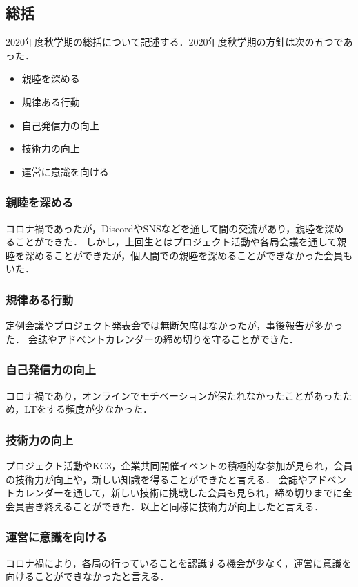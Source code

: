 \subsection*{\firstGrade{}総括}


2020年度秋学期の\firstGrade{}総括について記述する．2020年度秋学期の\firstGrade{}方針は次の五つであった．
\begin{itemize}
	\item 親睦を深める
	\item 規律ある行動
	\item 自己発信力の向上
	\item 技術力の向上
	\item 運営に意識を向ける
\end{itemize}

\subsubsection{親睦を深める}
コロナ禍であったが，DiscordやSNSなどを通して\firstGrade{}間の交流があり，親睦を深めることができた．
しかし，上回生とはプロジェクト活動や各局会議を通して親睦を深めることができたが，個人間での親睦を深めることができなかった会員もいた．

\subsubsection*{規律ある行動}
定例会議やプロジェクト発表会では無断欠席はなかったが，事後報告が多かった．
会誌やアドベントカレンダーの締め切りを守ることができた．

\subsubsection*{自己発信力の向上}
コロナ禍であり，オンラインでモチベーションが保たれなかったことがあったため，LTをする頻度が少なかった．

\subsubsection*{技術力の向上}
プロジェクト活動やKC3，企業共同開催イベントの積極的な参加が見られ，\firstGrade{}会員の技術力が向上や，新しい知識を得ることができたと言える．
会誌やアドベントカレンダーを通して，新しい技術に挑戦した会員も見られ，締め切りまでに全会員書き終えることができた．以上と同様に技術力が向上したと言える．

\subsubsection*{運営に意識を向ける}
コロナ禍により，各局の行っていることを認識する機会が少なく，運営に意識を向けることができなかったと言える．




